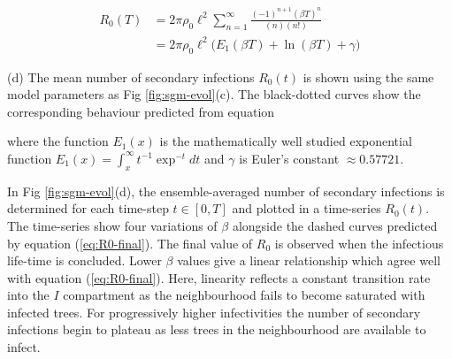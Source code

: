 \begin{fi}
\begin{equation} \label{eq:Appendix_final_expression}
\begin{split}
R_0(T) & = 2\pi\rho_0 \ell^2 \sum^{\infty}_{n=1} \frac{(-1)^{n+1} (\beta T)^n}{(n)(n!)}\\
& =  2\pi\rho_0 \ell^2 \big(E_1(\beta T) + \ln (\beta T) + \gamma\big)
\end{split}
\end{equation}


(d) The mean number of secondary infections $R_0(t)$ is shown using the same model parameters as Fig \ref{fig:sgm-evol}(c). The black-dotted curves show the corresponding behaviour predicted from equation

where the function $E_1(x)$ is the mathematically well studied exponential function $E_1(x)=\int^{\infty}_x t^{-1}\exp^{-t}dt$ and $\gamma$ is Euler's constant $\approx 0.57721$.


In Fig \ref{fig:sgm-evol}(d), the ensemble-averaged number of secondary infections is determined for each time-step $t\in [0, T]$ and plotted in a time-series $R_0(t)$. The time-series show four variations of $\beta$ alongside the dashed curves predicted by equation (\ref{eq:R0-final}). The final value of $R_0$ is observed when the infectious life-time is concluded. Lower $\beta$ values give a linear relationship which agree well with equation (\ref{eq:R0-final}). Here, linearity reflects a constant transition rate into the $I$ compartment as the neighbourhood fails to become saturated with infected trees. For progressively higher infectivities the number of secondary infections begin to plateau as less trees in the neighbourhood are available to infect.\\


\end{fi}
